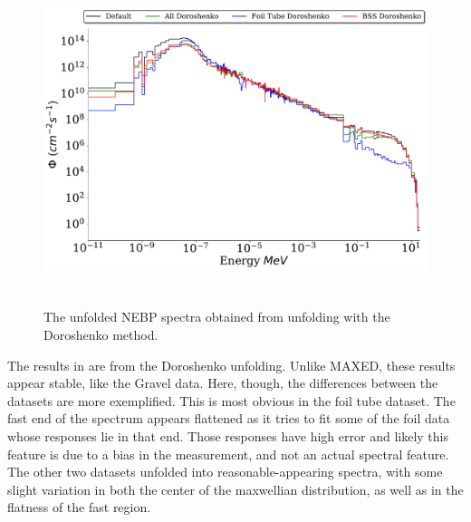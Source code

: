 \begin{figure}[htb]
\includegraphics[height=3.8in]{tex/figures/unfolded_do.pdf}
\caption[Doroshenko Unfolded Spectra]{The unfolded NEBP spectra obtained from unfolding with the Doroshenko method.}
\label{fig:unfolded_do}
\end{figure}

The results in  are from the Doroshenko unfolding.
Unlike MAXED, these results appear stable, like the Gravel data.
Here, though, the differences between the datasets are more exemplified.
This is most obvious in the foil tube dataset.
The fast end of the spectrum appears flattened as it tries to fit some of the foil data whose responses lie in that end.
Those responses have high error and likely this feature is due to a bias in the measurement, and not an actual spectral feature.
The other two datasets unfolded into reasonable-appearing spectra, with some slight variation in both the center of the maxwellian distribution, as well as in the flatness of the fast region.


